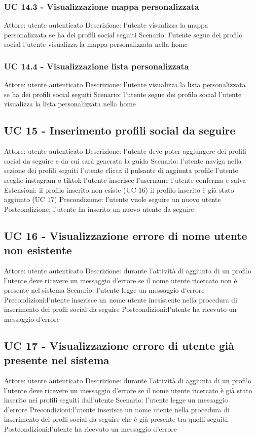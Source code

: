 \subsubsection{UC 14.3 - Visualizzazione mappa personalizzata}
Attore: utente autenticato
Descrizione: l’utente visualizza la mappa personalizzata se ha dei profili social seguiti
Scenario:
l’utente segue dei profilo social
l’utente visualizza la mappa personalizzata nella home

\subsubsection{UC 14.4 - Visualizzazione lista personalizzata}
Attore: utente autenticato
Descrizione: l’utente visualizza la lista personalizzata se ha dei profili social seguiti
Scenario:
l’utente segue dei profilo social
l’utente visualizza la lista personalizzata nella home

\subsection{UC 15 - Inserimento profili social da seguire}
Attore: utente autenticato
Descrizione: l’utente deve poter aggiungere dei profili social da seguire e da cui sarà generata la guida
Scenario:
l’utente naviga nella sezione dei profili seguiti
l’utente clicca il pulsante di aggiunta profile
l’utente sceglie instagram o tiktok
l’utente inserisce l’username
l’utente conferma e salva
Estensioni:
il profilo inserito non esiste (UC 16)
il profilo inserito è già stato aggiunto (UC 17)
Precondizione: l’utente vuole seguire un nuovo utente
Postcondizione: l’utente ha inserito un nuovo utente da seguire


\subsection{UC 16 - Visualizzazione errore di nome utente non esistente}
Attore: utente autenticato
Descrizione: durante l’attività di aggiunta di un profilo l’utente deve ricevere un messaggio d’errore se il nome utente ricercato non è presente nel sistema
Scenario: l’utente legge un messaggio d’errore
Precondizioni:l’utente inserisce un nome utente inesistente nella procedura di inserimento dei profli social da seguire
Postcondizioni:l’utente ha ricevuto un messaggio d’errore

\subsection{UC 17 - Visualizzazione errore di utente già presente nel sistema}
Attore: utente autenticato
Descrizione: durante l’attività di aggiunta di un profilo l’utente deve ricevere un messaggio d’errore se il nome utente ricercato è già stato inserito nei profili seguiti dall’utente
Scenario: l’utente legge un messaggio d’errore
Precondizioni:l’utente inserisce un nome utente nella procedura di inserimento dei profli social da seguire che è già presente tra quelli seguiti.
Postcondizioni:l’utente ha ricevuto un messaggio d’errore

